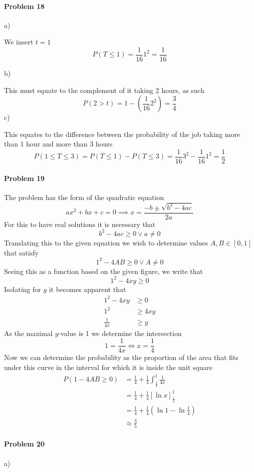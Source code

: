 \paragraph{Problem 18}
a)

We insert $t=1$
\[
    P(T\leq 1)=\frac{1}{16}1^{2}=\frac{1}{16}
\]

b) 

This must equate to the complement of it taking 2 hours, as such
\[
    P(2>t)=1-\left(\frac{1}{16}2^{2}\right)=\frac{3}{4}
\]
c)

This equates to the difference between the probability of the job taking more than 1 hour and more than 3 hours
\[
    P(1\leq T\leq 3)=P(T\leq 1)-P(T\leq 3)=\frac{1}{16}3^{2}-\frac{1}{16}1^{2}=\frac{1}{2}
\]
\paragraph{Problem 19}
The problem has the form of the quadratic equation
\[
    ax^{2}+bx+c=0\implies x=\frac{-b\pm\sqrt{b^{2}-4ac}}{2a}
\]
For this to have real solutions it is necessary that
\[
    b^{2}-4ac\geq 0\vee a\neq 0
\]
Translating this to the given equation we wish to determine values $A,B\in[0,1]$ that satisfy
\[
    1^{2}-4AB\geq 0\vee A\neq 0
\]
Seeing this as a function based on the given figure, we write that
\[
    1^{2}-4xy\geq 0
\]
Isolating for $y$ it becomes apparent that
\begin{align*}
    1^{2}-4xy&\geq 0 \\
    1^{2}&\geq 4xy \\
    \frac{1}{4x}&\geq y
\end{align*}
As the maximal $y$-value is 1 we determine the intersection
\[
    1=\frac{1}{4x}\Leftrightarrow x=\frac{1}{4}
\]
Now we can determine the probability as the proportion of the area that fits under this curve in the interval for which it is inside the unit square
\begin{align*}
    P(1-4AB\geq 0)&=\frac{1}{4}+\frac{1}{4}\int_{\frac{1}{4}}^{1}\frac{1}{4x} \\
               &=\frac{1}{4}+\frac{1}{4}\left[\ln{x}\right]_{\frac{1}{4}}^{1} \\
               &=\frac{1}{4}+\frac{1}{4}\left(\ln{1}-\ln{\frac{1}{4}}\right) \\
               &\approx\frac{3}{5}
\end{align*}
\paragraph{Problem 20}
a) 

